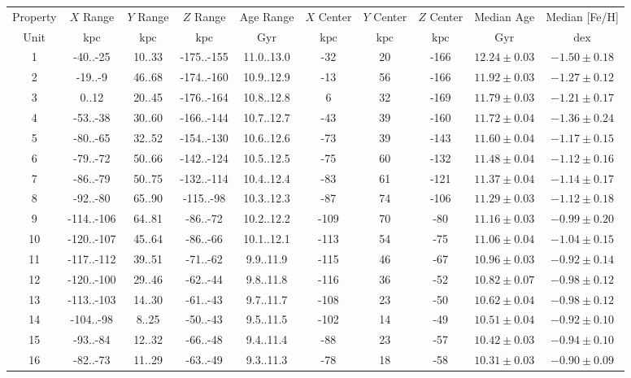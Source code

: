\begin{tabular}{cccccccccc}
\hline \hline
Property & $X$ Range & $Y$ Range & $Z$ Range & Age Range & $X$ Center & $Y$ Center & $Z$ Center & Median Age & Median [Fe/H] \\
Unit & $\mathrm{kpc}$ & $\mathrm{kpc}$ & $\mathrm{kpc}$ & $\mathrm{Gyr}$ & $\mathrm{kpc}$ & $\mathrm{kpc}$ & $\mathrm{kpc}$ & $\mathrm{Gyr}$ & $\mathrm{dex}$ \\
\hline
1 & -40..-25 & 10..33 & -175..-155 & 11.0..13.0 & -32 & 20 & -166 & $12.24\pm0.03$ & $-1.50\pm0.18$ \\
2 & -19..-9 & 46..68 & -174..-160 & 10.9..12.9 & -13 & 56 & -166 & $11.92\pm0.03$ & $-1.27\pm0.12$ \\
3 & 0..12 & 20..45 & -176..-164 & 10.8..12.8 & 6 & 32 & -169 & $11.79\pm0.03$ & $-1.21\pm0.17$ \\
4 & -53..-38 & 30..60 & -166..-144 & 10.7..12.7 & -43 & 39 & -160 & $11.72\pm0.04$ & $-1.36\pm0.24$ \\
5 & -80..-65 & 32..52 & -154..-130 & 10.6..12.6 & -73 & 39 & -143 & $11.60\pm0.04$ & $-1.17\pm0.15$ \\
6 & -79..-72 & 50..66 & -142..-124 & 10.5..12.5 & -75 & 60 & -132 & $11.48\pm0.04$ & $-1.12\pm0.16$ \\
7 & -86..-79 & 50..75 & -132..-114 & 10.4..12.4 & -83 & 61 & -121 & $11.37\pm0.04$ & $-1.14\pm0.17$ \\
8 & -92..-80 & 65..90 & -115..-98 & 10.3..12.3 & -87 & 74 & -106 & $11.29\pm0.03$ & $-1.12\pm0.18$ \\
9 & -114..-106 & 64..81 & -86..-72 & 10.2..12.2 & -109 & 70 & -80 & $11.16\pm0.03$ & $-0.99\pm0.20$ \\
10 & -120..-107 & 45..64 & -86..-66 & 10.1..12.1 & -113 & 54 & -75 & $11.06\pm0.04$ & $-1.04\pm0.15$ \\
11 & -117..-112 & 39..51 & -71..-62 & 9.9..11.9 & -115 & 46 & -67 & $10.96\pm0.03$ & $-0.92\pm0.14$ \\
12 & -120..-100 & 29..46 & -62..-44 & 9.8..11.8 & -116 & 36 & -52 & $10.82\pm0.07$ & $-0.98\pm0.12$ \\
13 & -113..-103 & 14..30 & -61..-43 & 9.7..11.7 & -108 & 23 & -50 & $10.62\pm0.04$ & $-0.98\pm0.12$ \\
14 & -104..-98 & 8..25 & -50..-43 & 9.5..11.5 & -102 & 14 & -49 & $10.51\pm0.04$ & $-0.92\pm0.10$ \\
15 & -93..-84 & 12..32 & -66..-48 & 9.4..11.4 & -88 & 23 & -57 & $10.42\pm0.03$ & $-0.94\pm0.10$ \\
16 & -82..-73 & 11..29 & -63..-49 & 9.3..11.3 & -78 & 18 & -58 & $10.31\pm0.03$ & $-0.90\pm0.09$ \\

\end{tabular}
